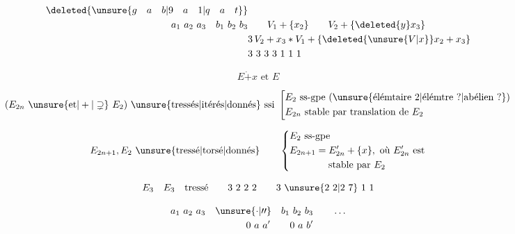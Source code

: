 \[
\begin{aligned}
\deleted{\unsure{g\quad a\quad b|9\quad a\quad1|q\quad a\quad t}}&\\
 a_1\ a_2\ a_3\quad b_1\ b_2\ b_3&\qquad V_1+\{x_2\}\qquad V_2+\{\deleted{y}x_3\}\\
&3\,V_2+x_3\ast V_1+\{\deleted{\unsure{V|x}}x_2+x_3\}\\
&3\ 3\ 3\ 3\ 1\ 1\ 1
\end{aligned}
\]

\[
E\mathbin{\dot+}x\text{ et }E
\]

\[
(E_{2n}\ \unsure{\text{et}|+|\supsetneq}\ E_2)\ \text{\unsure{tressés|itérés|donnés} ssi }\left[\begin{aligned}
&E_2\ \text{ss-gpe (\unsure{élémtaire 2|élémtre ?|abélien ?})}\\
&E_{2n}\ \text{stable par translation de }E_2
\end{aligned}\right.
\]


\[
E_{2n+1}, E_2\ \text{\unsure{tressé|torsé|donnés}}\qquad
\left\{\begin{aligned}
&E_2\ \text{ss-gpe}\\
&E_{2n+1}=E'_{2n}+\{x\},\text{ où }E'_{2n}\text{ est}\\
&\hspace{4em}\text{stable par }E_2
\end{aligned}\right.
\]

\[
E_3\quad E_3\quad\text{tressé}\qquad3\ 2\ 2\ 2\qquad 3\ \unsure{2\ 2|2\ 7}\ 1\ 1
\]

\[
\begin{aligned}
a_1\ a_2\ a_3\quad\unsure{\cdot|\prime\prime}\quad b_1\ b_2\ b_3&\qquad\ldots\\
0\ a\ a'\qquad0\ a\ b'&
\end{aligned}
\]


